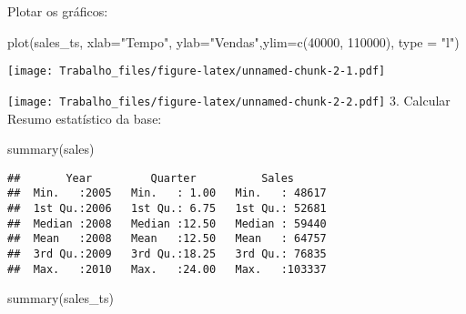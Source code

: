 \documentclass[
]{article}
\newenvironment{Shaded}{\begin{snugshade}}{\end{snugshade}}
\newcommand{\AttributeTok}[1]{\textcolor[rgb]{0.77,0.63,0.00}{#1}}
\newcommand{\DecValTok}[1]{\textcolor[rgb]{0.00,0.00,0.81}{#1}}
\newcommand{\FunctionTok}[1]{\textcolor[rgb]{0.00,0.00,0.00}{#1}}
\newcommand{\NormalTok}[1]{#1}
\newcommand{\SpecialCharTok}[1]{\textcolor[rgb]{0.00,0.00,0.00}{#1}}
\newcommand{\StringTok}[1]{\textcolor[rgb]{0.31,0.60,0.02}{#1}}
\begin{document}
Plotar os gráficos:

\begin{Shaded}
\begin{Highlighting}[]
\FunctionTok{plot}\NormalTok{(sales\_ts, }\AttributeTok{xlab=}\StringTok{"Tempo"}\NormalTok{, }\AttributeTok{ylab=}\StringTok{"Vendas"}\NormalTok{,}\AttributeTok{ylim=}\FunctionTok{c}\NormalTok{(}\DecValTok{40000}\NormalTok{, }\DecValTok{110000}\NormalTok{), }\AttributeTok{type =} \StringTok{"l"}\NormalTok{)}
\end{Highlighting}
\end{Shaded}

\texttt{[image: Trabalho\_files/figure-latex/unnamed-chunk-2-1.pdf]}

\begin{Shaded}
\end{Shaded}

\texttt{[image: Trabalho\_files/figure-latex/unnamed-chunk-2-2.pdf]} 3.
Calcular Resumo estatístico da base:

\begin{Shaded}
\begin{Highlighting}[]
\FunctionTok{summary}\NormalTok{(sales)}
\end{Highlighting}
\end{Shaded}

\begin{verbatim}
##       Year         Quarter          Sales       
##  Min.   :2005   Min.   : 1.00   Min.   : 48617  
##  1st Qu.:2006   1st Qu.: 6.75   1st Qu.: 52681  
##  Median :2008   Median :12.50   Median : 59440  
##  Mean   :2008   Mean   :12.50   Mean   : 64757  
##  3rd Qu.:2009   3rd Qu.:18.25   3rd Qu.: 76835  
##  Max.   :2010   Max.   :24.00   Max.   :103337
\end{verbatim}

\begin{Shaded}
\begin{Highlighting}[]
\FunctionTok{summary}\NormalTok{(sales\_ts)}
\end{Highlighting}
\end{Shaded}
\end{document}
